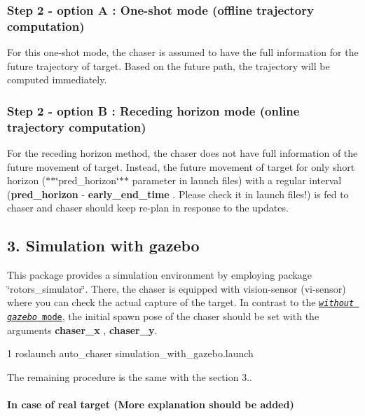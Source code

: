 \subsubsection*{Step 2 -\/ option A \+: One-\/shot mode (offline trajectory computation)}



For this one-\/shot mode, the chaser is assumed to have the full information for the future trajectory of target. Based on the future path, the trajectory will be computed immediately.

\subsubsection*{Step 2 -\/ option B \+: Receding horizon mode (online trajectory computation)}



For the receding horizon method, the chaser does not have full information of the future movement of target. Instead, the future movement of target for only short horizon ($\ast$$\ast$\char`\"{}pred\+\_\+horizon\char`\"{}$\ast$$\ast$ parameter in launch files) with a regular interval ({\bfseries pred\+\_\+horizon} -\/ {\bfseries early\+\_\+end\+\_\+time} . Please check it in launch files!) is fed to chaser and chaser should keep re-\/plan in response to the updates.

\subsection*{3. Simulation with gazebo}

This package provides a simulation environment by employing package \char`\"{}rotors\+\_\+simulator\char`\"{}. There, the chaser is equipped with vision-\/sensor (vi-\/sensor) where you can check the actual capture of the target. In contrast to the \href{#without}{\tt {\itshape without gazebo} mode}, the initial spawn pose of the chaser should be set with the arguments {\bfseries chaser\+\_\+x} , {\bfseries chaser\+\_\+y}.


\begin{DoxyCode}
1 roslaunch auto\_chaser simulation\_with\_gazebo.launch
\end{DoxyCode}


The remaining procedure is the same with the section 3..

\paragraph*{In case of real target (More explanation should be added)}

